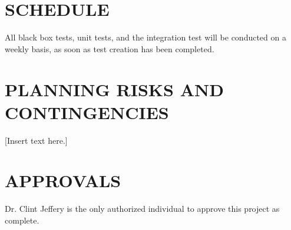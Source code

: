 \documentclass[twoside,letterpaper]{article}
\begin{document}
\section[SCHEDULE]{\bfseries SCHEDULE}

All black box tests, unit tests, and the integration test will be conducted on a weekly basis, as soon as test creation has been completed.

\section[PLANNING RISKS AND CONTINGENCIES]{\bfseries PLANNING RISKS AND CONTINGENCIES}

[Insert text here.]

\section[APPROVALS]{\bfseries APPROVALS}

Dr. Clint Jeffery is the only authorized individual to approve this project as complete.

			
\end{document}
